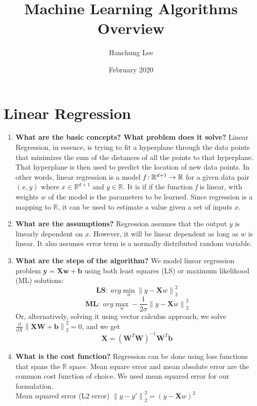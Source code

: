 \documentclass{article}
\title{Machine Learning Algorithms Overview}
\author{Hanchung Lee}
\date{February 2020}
\begin{document}
\maketitle

\section{Linear Regression}

\noindent
\begin{enumerate}
    \item \textbf{What are the basic concepts? What problem does it solve?}
    \noindent 
    \smallbreak
    Linear Regression, in essence, is trying to fit a hyperplane through the data points that minimizes the sum of the distances of all the points to that hyperplane. That hyperplane is then used to predict the location of new data points. In other words, linear regression is a model $\emph{f} : \mathbb{R}^{d+1} \rightarrow \mathbb{R}$ for a given data pair $(x, y)$ where $x \in \mathbb{R}^{d+1}$ and $y \in \mathbb{R}$. It is if if the function \emph{f} is linear, with weights $w$ of the model is the parameters to be learned. Since regression is a mapping to $\mathbb{R}$, it can be used to estimate a value given a set of inputs $x$.
    
    \item \textbf{What are the assumptions?}
    \noindent 
    \smallbreak
    Regression assumes that the output $y$ is linearly dependent on $x$. However, it will be linear dependent as long as $w$ is linear. It also assumes error term is a normally distributed random variable.
    
    \item \textbf{What are the steps of the algorithm?}
    \noindent 
    \smallbreak
    We model linear regression problem $\mathbf{y} = \mathbf{X}\mathbf{w} + \mathbf{b}$ using both least squares (LS) or maximum likelihood (ML) solutions:
    $$\mathbf{LS}: \; arg \min_{w} \left\|y - \mathbf{X}w\right\|_{2}^{2}$$
    $$\mathbf{ML}: \; arg \max_{w} -\frac{1}{2\sigma}\left\|y - \mathbf{X}w\right\|_{2}^{2}$$
    Or, alternatively, solving it using vector calculus approach, we solve $\frac{\partial}{\partial{X}}\left\|\mathbf{X}\mathbf{W} + \mathbf{b}\right\|_{2}^{2} = 0$, and we get
    $$\mathbf{X} = (\mathbf{W}^T\mathbf{W})^{-1}\mathbf{W}^T\mathbf{b}$$
    
    \item \textbf{What is the cost function?}
    \noindent 
    \smallbreak
    Regression can be done using loss functions that spans the $\mathbb{R}$ space. Mean square error and mean absolute error are the common cost function of choice. We used mean squared error for our formulation.\\
    \smallbreak
    Mean squared error (L2 error)  $\left\|y - y'\right\|_{2}^2 = (y - \mathbf{X}w)^2$ \\ 
    

\end{enumerate}
\end{document}
